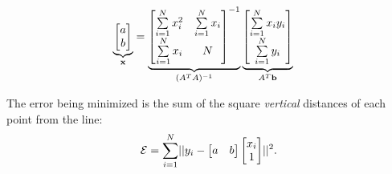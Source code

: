\begin{problem}
\begin{enumroman}
\begin{answer}
        \begin{align*}
          \underbrace{\begin{bmatrix}
            a \\
            b
          \end{bmatrix}}_{\mathbf{x}}
          &=
          \underbrace{\begin{bmatrix}
            \sum\limits_{i=1}^N x_i^2 & \sum\limits_{i=1}^N x_i \\
            \sum\limits_{i=1}^N x_i & N
          \end{bmatrix}^{-1}}_{(A^T A)^{-1}}
          \underbrace{\begin{bmatrix}
            \sum\limits_{i=1}^N x_i y_i \\
            \sum\limits_{i=1}^N y_i
          \end{bmatrix}}_{A^T \mathbf{b}}
        \end{align*}

        \newpage
        The error being minimized is the sum of the square
        \emph{vertical} distances of each point from the line:
        \[ \mathcal{E} = \sum_{i=1}^N \lvert\lvert y_i - 
            \begin{bmatrix} a & b \end{bmatrix}
            \begin{bmatrix} x_i \\ 1 \end{bmatrix}\rvert
          \rvert^2. \]

        \begin{figure}[H]
          \centering
\end{figure}
\end{answer}
\end{enumroman}
\end{problem}
